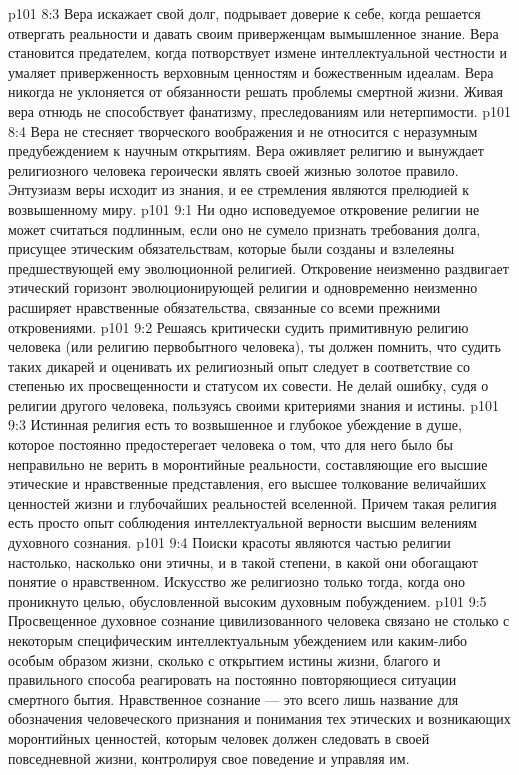 \vs p101 8:3 Вера искажает свой долг, подрывает доверие к себе, когда решается отвергать реальности и давать своим приверженцам вымышленное знание. Вера становится предателем, когда потворствует измене интеллектуальной честности и умаляет приверженность верховным ценностям и божественным идеалам. Вера никогда не уклоняется от обязанности решать проблемы смертной жизни. Живая вера отнюдь не способствует фанатизму, преследованиям или нетерпимости.
\vs p101 8:4 Вера не стесняет творческого воображения и не относится с неразумным предубеждением к научным открытиям. Вера оживляет религию и вынуждает религиозного человека героически являть своей жизнью золотое правило. Энтузиазм веры исходит из знания, и ее стремления являются прелюдией к возвышенному миру.
\vs p101 9:1 Ни одно исповедуемое откровение религии не может считаться подлинным, если оно не сумело признать требования долга, присущее этическим обязательствам, которые были созданы и взлелеяны предшествующей ему эволюционной религией. Откровение неизменно раздвигает этический горизонт эволюционирующей религии и одновременно неизменно расширяет нравственные обязательства, связанные со всеми прежними откровениями.
\vs p101 9:2 Решаясь критически судить примитивную религию человека (или религию первобытного человека), ты должен помнить, что судить таких дикарей и оценивать их религиозный опыт следует в соответствие со степенью их просвещенности и статусом их совести. Не делай ошибку, судя о религии другого человека, пользуясь своими критериями знания и истины.
\vs p101 9:3 Истинная религия есть то возвышенное и глубокое убеждение в душе, которое постоянно предостерегает человека о том, что для него было бы неправильно не верить в моронтийные реальности, составляющие его высшие этические и нравственные представления, его высшее толкование величайших ценностей жизни и глубочайших реальностей вселенной. Причем такая религия есть просто опыт соблюдения интеллектуальной верности высшим велениям духовного сознания.
\vs p101 9:4 Поиски красоты являются частью религии настолько, насколько они этичны, и в такой степени, в какой они обогащают понятие о нравственном. Искусство же религиозно только тогда, когда оно проникнуто целью, обусловленной высоким духовным побуждением.
\vs p101 9:5 Просвещенное духовное сознание цивилизованного человека связано не столько с некоторым специфическим интеллектуальным убеждением или каким\hyp{}либо особым образом жизни, сколько с открытием истины жизни, благого и правильного способа реагировать на постоянно повторяющиеся ситуации смертного бытия. Нравственное сознание --- это всего лишь название для обозначения человеческого признания и понимания тех этических и возникающих моронтийных ценностей, которым человек должен следовать в своей повседневной жизни, контролируя свое поведение и управляя им.
